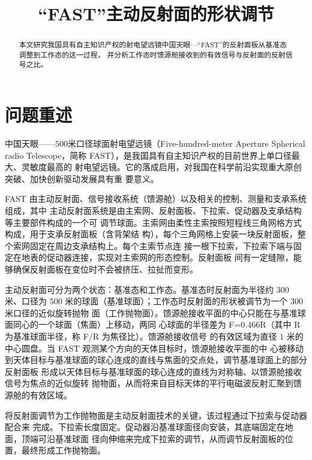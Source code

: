 \documentclass[withoutpreface,bwprint]{cumcmthesis} %
\title{“FAST”主动反射面的形状调节}
\begin{document}
\maketitle
\begin{abstract}
本文研究我国具有自主知识产权的射电望远镜中国天眼---“FAST”的反射面板从基准态调整到工作态的这一过程，
并分析工作态时馈源舱接收到的有效信号与反射面的反射信号之比。
\end{abstract}



\section{问题重述}
中国天眼——$500$米口径球面射电望远镜（Five-hundred-meter Aperture Spherical radio
Telescope，简称 FAST），是我国具有自主知识产权的目前世界上单口径最大、灵敏度最高的
射电望远镜。它的落成启用，对我国在科学前沿实现重大原创突破、加快创新驱动发展具有重
要意义。

FAST 由主动反射面、信号接收系统（馈源舱）以及相关的控制、测量和支承系统组成，其中
主动反射面系统是由主索网、反射面板、下拉索、促动器及支承结构等主要部件构成的一个可
调节球面。主索网由柔性主索按照短程线三角网格方式构成，用于支承反射面板（含背架结
构），每个三角网格上安装一块反射面板，整个索网固定在周边支承结构上。每个主索节点连
接一根下拉索，下拉索下端与固定在地表的促动器连接，实现对主索网的形态控制。反射面板
间有一定缝隙，能够确保反射面板在变位时不会被挤压、拉扯而变形。

主动反射面可分为两个状态：基准态和工作态。基准态时反射面为半径约 $300$ 米、口径为
$500$ 米的球面（基准球面）；工作态时反射面的形状被调节为一个 $300$ 米口径的近似旋转抛物
面（工作抛物面）。馈源舱接收平面的中心只能在与基准球面同心的一个球面（焦面）上移动，两同
心球面的半径差为 F=$0.466$R（其中 R 为基准球面半径，称 F/R 为焦径比）。馈源舱接收信号
的有效区域为直径 $1$ 米的中心圆盘。当 FAST 观测某个方向的天体目标时，馈源舱接收平面的中
心被移动到天体目标与基准球面的球心连成的直线与焦面的交点处，调节基准球面上的部分反射面板
形成以天体目标与基准球面的球心连成的直线为对称轴、以馈源舱接收信号为焦点的近似旋转
抛物面，从而将来自目标天体的平行电磁波反射汇聚到馈源舱的有效区域。

将反射面调节为工作抛物面是主动反射面技术的关键，该过程通过下拉索与促动器配合来
完成。下拉索长度固定。促动器沿基准球面径向安装，其底端固定在地面，顶端可沿基准球面
径向伸缩来完成下拉索的调节，从而调节反射面板的位置，最终形成工作抛物面。
\end{document}
